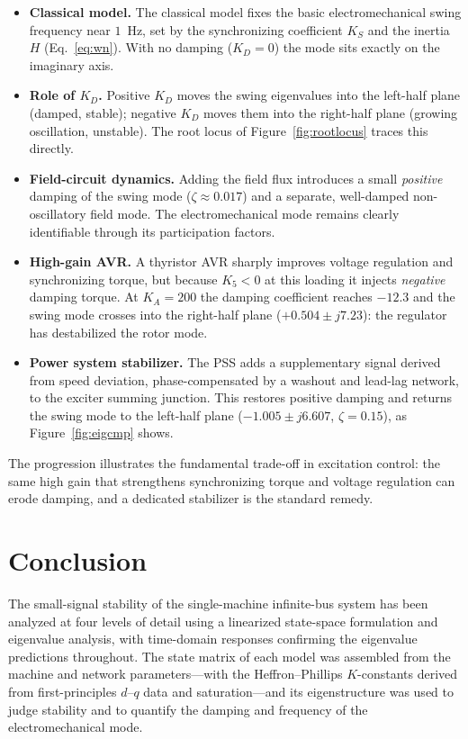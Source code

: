 \documentclass[12pt,a4paper]{article}
\begin{document}
\begin{itemize}
    \item \textbf{Classical model.} The classical model fixes the basic
          electromechanical swing frequency near $1$~Hz, set by the
          synchronizing coefficient $K_S$ and the inertia $H$
          (Eq.~\ref{eq:wn}). With no damping ($K_D=0$) the mode sits exactly on
          the imaginary axis.
    \item \textbf{Role of $K_D$.} Positive $K_D$ moves the swing eigenvalues
          into the left-half plane (damped, stable); negative $K_D$ moves them
          into the right-half plane (growing oscillation, unstable). The root
          locus of Figure~\ref{fig:rootlocus} traces this directly.
    \item \textbf{Field-circuit dynamics.} Adding the field flux introduces a
          small \emph{positive} damping of the swing mode ($\zeta\approx0.017$)
          and a separate, well-damped non-oscillatory field mode. The
          electromechanical mode remains clearly identifiable through its
          participation factors.
    \item \textbf{High-gain AVR.} A thyristor AVR sharply improves voltage
          regulation and synchronizing torque, but because $K_5<0$ at this
          loading it injects \emph{negative} damping torque. At $K_A=200$ the
          damping coefficient reaches $-12.3$ and the swing mode crosses into the
          right-half plane ($+0.504\pm j7.23$): the regulator has destabilized
          the rotor mode.
    \item \textbf{Power system stabilizer.} The PSS adds a supplementary signal
          derived from speed deviation, phase-compensated by a washout and
          lead-lag network, to the exciter summing junction. This restores
          positive damping and returns the swing mode to the left-half plane
          ($-1.005\pm j6.607$, $\zeta=0.15$), as Figure~\ref{fig:eigcmp} shows.
\end{itemize}

The progression illustrates the fundamental trade-off in excitation control: the
same high gain that strengthens synchronizing torque and voltage regulation can
erode damping, and a dedicated stabilizer is the standard remedy.

\section{Conclusion}

The small-signal stability of the single-machine infinite-bus system has been
analyzed at four levels of detail using a linearized state-space formulation and
eigenvalue analysis, with time-domain responses confirming the eigenvalue
predictions throughout. The state matrix of each model was assembled from the
machine and network parameters---with the Heffron--Phillips $K$-constants derived
from first-principles $d$--$q$ data and saturation---and its eigenstructure was
used to judge stability and to quantify the damping and frequency of the
electromechanical mode.
\end{document}
